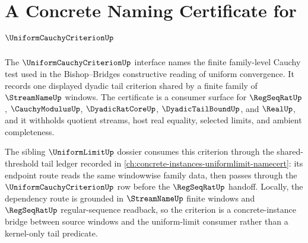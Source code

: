 \chapter{A Concrete Naming Certificate for $\UniformCauchyCriterionUp$}
\label{ch:concrete-instances-uniformcauchycriterion-namecert}

The $\UniformCauchyCriterionUp$ interface names the finite family-level Cauchy test used in the Bishop--Bridges constructive reading of uniform convergence. It records one displayed dyadic tail criterion shared by a finite family of $\StreamNameUp$ windows. The certificate is a consumer surface for $\RegSeqRatUp$, $\CauchyModulusUp$, $\DyadicRatCoreUp$, $\DyadicTailBoundUp$, and $\RealUp$, and it withholds quotient streams, host real equality, selected limits, and ambient completeness.

The sibling $\UniformLimitUp$ dossier consumes this criterion through the shared-threshold tail ledger recorded in \autoref{ch:concrete-instances-uniformlimit-namecert}: its endpoint route reads the same windowwise family data, then passes through the $\UniformCauchyCriterionUp$ row before the $\RegSeqRatUp$ handoff. Locally, the dependency route is grounded in $\StreamNameUp$ finite windows and $\RegSeqRatUp$ regular-sequence readback, so the criterion is a concrete-instance bridge between source windows and the uniform-limit consumer rather than a kernel-only tail predicate.

